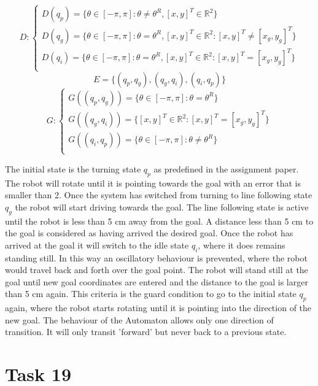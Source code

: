\documentclass[a4paper,12pt,oneside,onecolumn]{article} %
\begin{document}
\begin{equation}
D:
\begin{cases}
D(q_p)=\{\theta\in[-\pi, \pi]: \theta\neq\theta^R, [x,y]^T\in\mathbb{R}^2\}\\
D(q_g)=\{\theta\in[-\pi, \pi]: \theta=\theta^R, [x,y]^T\in\mathbb{R}^2:[x,y]^T\neq[x_g,y_g]^T\}\\
D(q_i)=\{\theta\in[-\pi, \pi]: \theta=\theta^R,[x,y]^T\in\mathbb{R}^2:[x,y]^T=[x_g,y_g]^T\}\\
\end{cases}
\end{equation}
\begin{equation}
E=\{(q_p,q_g),(q_g,q_i),(q_i,q_p)\}
\end{equation}
\begin{equation}
G: 
\begin{cases}
G((q_p,q_g))=\{\theta\in[-\pi, \pi]: \theta=\theta^R\}\\
G((q_g,q_i))=\{[x,y]^T\in\mathbb{R}^2:[x,y]^T=[x_g,y_g]^T\}\\
G((q_i,q_p))=\{\theta\in[-\pi, \pi]: \theta\neq\theta^R\}\\
\end{cases}
\end{equation}

The initial state is the turning state $q_p$ as predefined in the assignment paper. The robot will rotate until it is pointing towards the goal with an error that is smaller than 2\degree. Once the system has switched from turning to line following state $q_g$ the robot will start driving towards the goal. The line following state is active until the robot is less than 5 cm away from the goal. A distance less than 5 cm to the goal is considered as having arrived the desired goal. Once the robot has arrived  at the goal it will switch to the idle state $q_i$, where it does remains standing still. In this way an oscillatory behaviour is prevented, where the robot would travel back and forth over the goal point. The robot will stand still at the goal until new goal coordinates are entered and the distance to the goal is larger than 5 cm again. This criteria is the guard condition to go to the initial state $q_p$ again, where the robot starts rotating until it is pointing into the direction of the new goal.
The behaviour of the Automaton allows only one direction of transition. It will only transit 'forward' but never back to a previous state.

\section*{Task 19}
\end{document}
